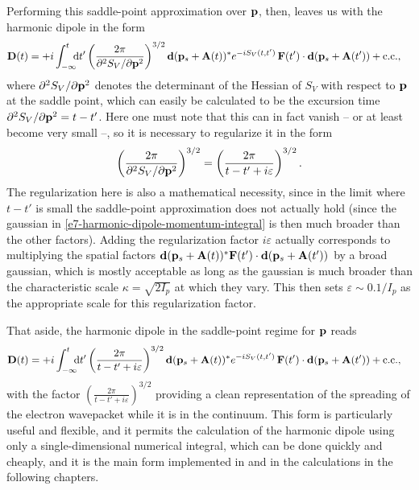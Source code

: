 Performing this saddle-point approximation over $\vb{p}$, then, leaves us with the harmonic dipole in the form
\begin{align}
\vb{D}(t)
& = 
+i\int_{-\infty}^{t} \!\!\! \mathrm{d} t'
\left(\frac{2\pi}{\partial^2 S_V/\partial \vb{p}^2}\right)^{3/2}
\vb{d}(\vb{p}_s+\vb{A}(t))^*
e^{-iS_V(t,t')}  \,
\vb{F}(t')\cdot \vb{d}(\vb{p}_s+\vb{A}(t'))
+\mathrm{c.c.}
,
\label{e7-harmonic-dipole-momentum-spa}
\end{align}
where $\partial^2 S_V/\partial \vb{p}^2$ denotes the determinant of the Hessian of $S_V$ with respect to $\vb{p}$ at the saddle point, which can easily be calculated to be the excursion time $\partial^2 S_V/\partial \vb{p}^2 = t-t'$. Here one must note that this can in fact vanish -- or at least become very small --, so it is necessary to regularize it in the form
\begin{equation}
\left(\frac{2\pi}{\partial^2 S_V/\partial \vb{p}^2}\right)^{3/2}
=
\left(\frac{2\pi}{t-t' + i\varepsilon}\right)^{3/2}
.
\end{equation}
The regularization here is also a mathematical necessity, since in the limit where $t-t'$ is small the saddle-point approximation does not actually hold (since the gaussian in \eqref{e7-harmonic-dipole-momentum-integral} is then much broader than the other factors). Adding the regularization factor $i\varepsilon$ actually corresponds to multiplying the spatial factors $\vb{d}(\vb{p}_s+\vb{A}(t))^*\vb{F}(t')\cdot \vb{d}(\vb{p}_s+\vb{A}(t'))$ by a broad gaussian, which is mostly acceptable as long as the gaussian is much broader than the characteristic scale $\kappa = \sqrt{2I_p}$ at which they vary. This then sets $\varepsilon \sim 0.1/I_p$ as the appropriate scale for this regularization factor.

That aside, the harmonic dipole in the saddle-point regime for $\vb{p}$ reads
\begin{align}
\vb{D}(t)
& = 
+i\int_{-\infty}^{t} \!\!\! \mathrm{d} t'
\left(\frac{2\pi}{t-t' + i\varepsilon}\right)^{3/2}
\vb{d}(\vb{p}_s+\vb{A}(t))^*
e^{-iS_V(t,t')}  \,
\vb{F}(t')\cdot \vb{d}(\vb{p}_s+\vb{A}(t'))
+\mathrm{c.c.}
,
\label{e7-harmonic-dipole-final}
\end{align}
with the factor $\left(\frac{2\pi}{t-t' + i\varepsilon}\right)^{3/2}$ providing a clean representation of the spreading of the electron wavepacket while it is in the continuum. This form is particularly useful and flexible, and it permits the calculation of the harmonic dipole using only a single-dimensional numerical integral, which can be done quickly and cheaply, and it is the main form implemented in  and in the calculations in the following chapters.



